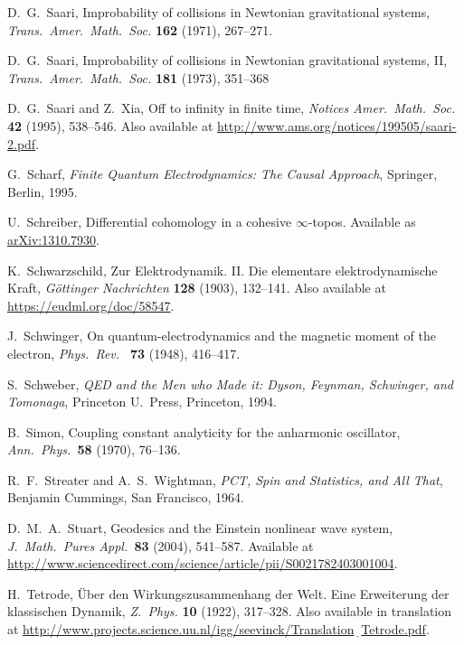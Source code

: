 \documentclass{article}
\begin{document}
\begin{thebibliography}{10}
 D.\ G.\ Saari,  Improbability of collisions in Newtonian gravitational systems, \textsl{Trans.\ Amer.\ Math.\ Soc.} \textbf{162} (1971), 267--271.

 D.\ G.\ Saari, Improbability of collisions in Newtonian gravitational systems, II, \textsl{Trans.\ Amer.\ Math.\ Soc.} \textbf{181} (1973), 351--368 

 D.\ G.\ Saari and Z.\ Xia, Off to infinity in finite time,
\textsl{Notices Amer.\ Math.\ Soc.} \textbf{42} (1995), 538--546.  Also available at 
\href{http://www.ams.org/notices/199505/saari-2.pdf}{http://www.ams.org/\break notices/199505/saari-2.pdf}.

 G.\ Scharf, \textsl{Finite Quantum Electrodynamics: The Causal Approach}, Springer, Berlin, 1995.  

 U.\ Schreiber, Differential cohomology in a cohesive $\infty$-topos.  Available as \href{http://arxiv.org/abs/1310.7930}{arXiv:1310.7930}. 

 K.\ Schwarzschild, Zur Elektrodynamik. II. Die elementare elektrodynamische Kraft, \textsl{G\"ottinger Nachrichten} \textbf{128} (1903), 132--141.  Also available at \href{https://eudml.org/doc/58547}{https://eudml.org/doc/58547}.

 J.\ Schwinger, On quantum-electrodynamics and the magnetic moment of the electron, \textsl{Phys.\ Rev.\ } \textbf{73} (1948), 416--417.  

 S.\ Schweber, \textsl{QED and the Men who Made it: Dyson, Feynman, Schwinger, and Tomonaga}, Princeton U.\ Press, Princeton, 1994.
 
 B.\ Simon, Coupling constant analyticity for the anharmonic oscillator, \textsl{Ann.\ Phys.\ }\textbf{58} (1970), 76--136. 

 R.\ F.\ Streater and A.\ S.\ Wightman, \textsl{PCT, Spin and Statistics, and All That}, Benjamin Cummings, San Francisco, 1964.

 D.\ M.\ A.\ Stuart, Geodesics and the Einstein nonlinear wave system, 
\textsl{J.\ Math.\ Pures Appl.\ }\textbf{83} (2004), 541--587.  Available at \href{http://www.sciencedirect.com/science/article/pii/S0021782403001004}{http://www.sciencedirect.com/science/article/pii/S0021782403001004}.

 H.\ Tetrode, \"Uber den Wirkungszusammenhang der Welt. Eine Erweiterung der klassischen Dynamik, \textsl{Z.\ Phys.} \textbf{10} (1922), 317--328.  Also available in translation at  \href{http://www.projects.science.uu.nl/igg/seevinck/Translation_Tetrode.pdf}{http://\break www.projects.science.uu.nl/igg/seevinck/Translation$\underline{\;\;}$Tetrode.pdf}.


\end{thebibliography}
\end{document}
